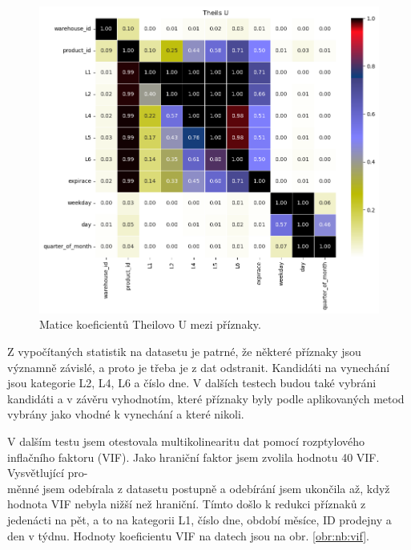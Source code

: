 \begin{figure}[hbtp!]
    \centering
    \includegraphics[width=.8\textwidth]{obrazky/zntb/theils_u.png}
    \caption{Matice koeficientů Theilovo U mezi příznaky.}
    \label{obr:nb:thiels}
\end{figure}

Z vypočítaných statistik na datasetu je patrné, že některé příznaky jsou významně závislé, a proto je třeba je z dat odstranit. Kandidáti na vynechání jsou kategorie L2, L4, L6 a číslo dne. V dalších testech budou také vybráni kandidáti a v závěru vyhodnotím, které příznaky byly podle aplikovaných metod vybrány jako vhodné k vynechání a které nikoli.

V dalším testu jsem otestovala multikolinearitu dat pomocí rozptylového inflačního faktoru (VIF). Jako hraniční faktor jsem zvolila hodnotu 40 VIF. Vysvětlující pro-\\měnné jsem odebírala z datasetu postupně a odebírání jsem ukončila až, když hodnota VIF nebyla nižší než hraniční.
Tímto došlo k redukci příznaků z jedenácti na pět, a to na kategorii L1, číslo dne, období měsíce, ID prodejny a den v týdnu. Hodnoty koeficientu VIF na datech jsou na obr. \ref*{obr:nb:vif}. 

